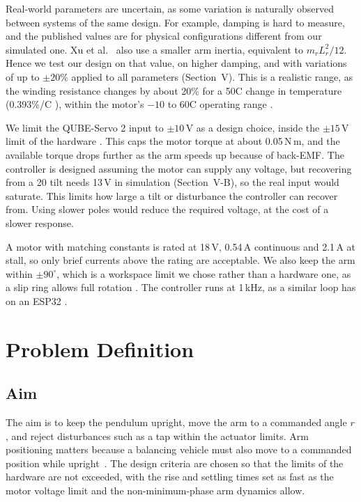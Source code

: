 Real-world parameters are uncertain, as some variation is naturally observed between systems of the same design. For example, damping is hard to measure, and the published values are for physical configurations different from our simulated one. Xu et al.\ \cite{xu2023} also use a smaller arm inertia, equivalent to $m_rL_r^2/12$. Hence we test our design on that value, on higher damping, and with variations of up to $\pm20\%$ applied to all parameters (Section~V). This is a realistic range, as the winding resistance changes by about 20\% for a 50\textdegree C change in temperature (0.393\%/\textdegree C \cite{iec60028}), within the motor's $-10$ to 60\textdegree C operating range \cite{allied}.

We limit the QUBE-Servo 2 input to $\pm10$\,V as a design choice, inside the $\pm15$\,V limit of the hardware \cite{quanserdocs}. This caps the motor torque at about 0.05\,N\,m, and the available torque drops further as the arm speeds up because of back-EMF. The controller is designed assuming the motor can supply any voltage, but recovering from a 20\textdegree{} tilt needs 13\,V in simulation (Section~V-B), so the real input would saturate. This limits how large a tilt or disturbance the controller can recover from. Using slower poles would reduce the required voltage, at the cost of a slower response.
\begin{rw}
A motor with matching constants \cite{allied} is rated at 18\,V, 0.54\,A continuous and 2.1\,A at stall, so only brief currents above the rating are acceptable. We also keep the arm within $\pm90^\circ$, which is a workspace limit we chose rather than a hardware one, as a slip ring allows full rotation \cite{acosta2010}. The controller runs at 1\,kHz, as a similar loop has on an ESP32 \cite{souza2026}.
\end{rw}

\section{Problem Definition}
\subsection{Aim}
The aim is to keep the pendulum upright, move the arm to a commanded angle $r$, and reject disturbances such as a tap within the actuator limits. Arm positioning matters because a balancing vehicle must also move to a commanded position while upright~\cite{pujol2014}. The design criteria are chosen so that the limits of the hardware are not exceeded, with the rise and settling times set as fast as the motor voltage limit and the non-minimum-phase arm dynamics allow.

